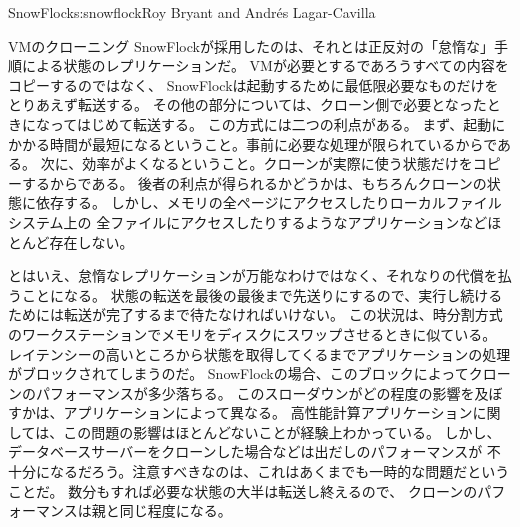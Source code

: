 \begin{aosachapter}{SnowFlock}{s:snowflock}{Roy Bryant and Andr\'e{s} Lagar-Cavilla}
\begin{aosasect1}{VMのクローニング}
SnowFlockが採用したのは、それとは正反対の「怠惰な」手順による状態のレプリケーションだ。
VMが必要とするであろうすべての内容をコピーするのではなく、
SnowFlockは起動するために最低限必要なものだけをとりあえず転送する。
その他の部分については、クローン側で必要となったときになってはじめて転送する。
この方式には二つの利点がある。
まず、起動にかかる時間が最短になるということ。事前に必要な処理が限られているからである。
次に、効率がよくなるということ。クローンが実際に使う状態だけをコピーするからである。
後者の利点が得られるかどうかは、もちろんクローンの状態に依存する。
しかし、メモリの全ページにアクセスしたりローカルファイルシステム上の
全ファイルにアクセスしたりするようなアプリケーションなどほとんど存在しない。

とはいえ、怠惰なレプリケーションが万能なわけではなく、それなりの代償を払うことになる。
状態の転送を最後の最後まで先送りにするので、実行し続けるためには転送が完了するまで待たなければいけない。
この状況は、時分割方式のワークステーションでメモリをディスクにスワップさせるときに似ている。
レイテンシーの高いところから状態を取得してくるまでアプリケーションの処理がブロックされてしまうのだ。
SnowFlockの場合、このブロックによってクローンのパフォーマンスが多少落ちる。
このスローダウンがどの程度の影響を及ぼすかは、アプリケーションによって異なる。
高性能計算アプリケーションに関しては、この問題の影響はほとんどないことが経験上わかっている。
しかし、データベースサーバーをクローンした場合などは出だしのパフォーマンスが
不十分になるだろう。注意すべきなのは、これはあくまでも一時的な問題だということだ。
数分もすれば必要な状態の大半は転送し終えるので、
クローンのパフォーマンスは親と同じ程度になる。


\end{aosasect1}
\end{aosachapter}
